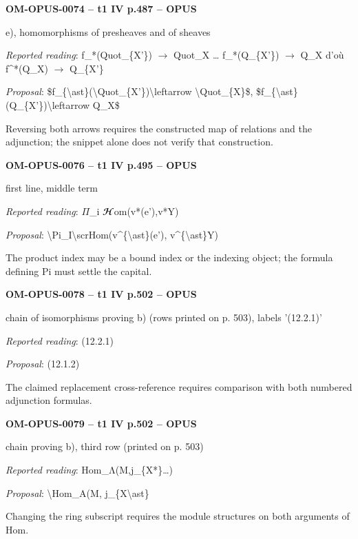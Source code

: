 \par\noindent\textbf{OM-OPUS-0074 -- t1 IV p.487 -- OPUS}\par
e), homomorphisms of presheaves and of sheaves\par
\emph{Reported reading}: f\_*(Quot\_\{X'\}) \ensuremath{\longrightarrow} Quot\_X … f\_*(Q\_\{X'\}) \ensuremath{\longrightarrow} Q\_X d'où f\textasciicircum{}*(Q\_X) \ensuremath{\longrightarrow} Q\_\{X'\}\par
\emph{Proposal}: \$f\_\{\textbackslash{}ast\}(\textbackslash{}Quot\_\{X'\})\textbackslash{}leftarrow \textbackslash{}Quot\_\{X\}\$, \$f\_\{\textbackslash{}ast\}(Q\_\{X'\})\textbackslash{}leftarrow Q\_X\$\par
Reversing both arrows requires the constructed map of relations and the adjunction; the snippet alone does not verify that construction.\par
\par\noindent\textbf{OM-OPUS-0076 -- t1 IV p.495 -- OPUS}\par
first line, middle term\par
\emph{Reported reading}: \ensuremath{\Pi}\_i \ensuremath{𝓗}om(v*(e'),v*Y)\par
\emph{Proposal}: \textbackslash{}Pi\_I\textbackslash{}scrHom(v\textasciicircum{}\{\textbackslash{}ast\}(e'), v\textasciicircum{}\{\textbackslash{}ast\}Y)\par
The product index may be a bound index or the indexing object; the formula defining Pi must settle the capital.\par
\par\noindent\textbf{OM-OPUS-0078 -- t1 IV p.502 -- OPUS}\par
chain of isomorphisms proving b) (rows printed on p. 503), labels '(12.2.1)'\par
\emph{Reported reading}: (12.2.1)\par
\emph{Proposal}: (12.1.2)\par
The claimed replacement cross-reference requires comparison with both numbered adjunction formulas.\par
\par\noindent\textbf{OM-OPUS-0079 -- t1 IV p.502 -- OPUS}\par
chain proving b), third row (printed on p. 503)\par
\emph{Reported reading}: Hom\_Λ(M,j\_\{X*\}…)\par
\emph{Proposal}: \textbackslash{}Hom\_A(M, j\_\{X\textbackslash{}ast\}\par
Changing the ring subscript requires the module structures on both arguments of Hom.\par
